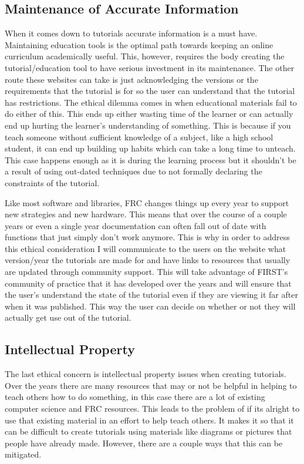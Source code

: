 \documentclass[10pt,twocolumn]{article}
\begin{document}
\subsection{Maintenance of Accurate Information}
When it comes down to tutorials accurate information is a must have. Maintaining education tools is the optimal path towards keeping an online curriculum academically useful\cite{Davies_et_al_2017}. This, however, requires the body creating the tutorial/education tool to have serious investment in its maintenance. The other route these websites can take is just acknowledging the versions or the requirements that the tutorial is for so the user can understand that the tutorial has restrictions. The ethical dilemma comes in when educational materials fail to do either of this. This ends up either wasting time of the learner or can actually end up hurting the learner's understanding of something. This is because if you teach someone without sufficient knowledge of a subject, like a high school student, it can end up building up habits which can take a long time to unteach. This case happens enough as it is during the learning process but it shouldn't be a result of using out-dated techniques due to not formally declaring the constraints of the tutorial. 

Like most software and libraries, FRC changes things up every year to support new strategies and new hardware. This means that over the course of a couple years or even a single year documentation can often fall out of date with functions that just simply don't work anymore. This is why in order to address this ethical consideration I will communicate to the users on the website what version/year the tutorials are made for and have links to resources that usually are updated through community support. This will take advantage of FIRST's community of practice that it has developed over the years and will ensure that the user's understand the state of the tutorial even if they are viewing it far after when it was published. This way the user can decide on whether or not they will actually get use out of the tutorial.

\subsection{Intellectual Property}
The last ethical concern is intellectual property issues when creating tutorials. Over the years there are many resources that may or not be helpful in helping to teach others how to do something, in this case there are a lot of existing computer science and FRC resources. This leads to the problem of if its alright to use that existing material in an effort to help teach others. It makes it so that it can be difficult to create tutorials using materials like diagrams or pictures that people have already made. However, there are a couple ways that this can be mitigated.
\end{document}
